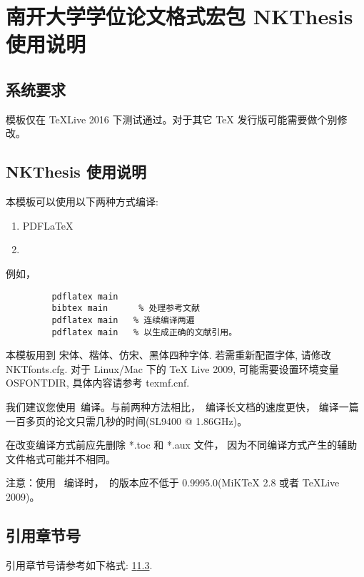 
\chapter{南开大学学位论文格式宏包 NKThesis 使用说明} \label{chpt:A}

\section{系统要求}

模板仅在 TeXLive 2016 下测试通过。对于其它 TeX 发行版可能需要做个别修改。

\section{NKThesis 使用说明}

本模板可以使用以下两种方式编译:
\begin{enumerate}
 \item PDF\LaTeX

 \item \XeLaTeX [推荐]
\end{enumerate}

例如，
\begin{verbatim}
         pdflatex main
         bibtex main      % 处理参考文献
         pdflatex main   % 连续编译两遍
         pdflatex main   % 以生成正确的文献引用。
\end{verbatim}





本模板用到 宋体、楷体、仿宋、黑体四种字体. 若需重新配置字体, 请修改 NKTfonts.cfg.
对于 Linux/Mac 下的 TeX Live 2009, 可能需要设置环境变量 OSFONTDIR, 具体内容请参考 texmf.cnf.


我们建议您使用\XeLaTeX\ 编译。与前两种方法相比，\XeLaTeX\  编译长文档的速度更快，
编译一篇一百多页的论文只需几秒的时间(SL9400 @ 1.86GHz)。

在改变编译方式前应先删除 *.toc 和 *.aux 文件，
因为不同编译方式产生的辅助文件格式可能并不相同。



注意：使用 \XeLaTeX\ 编译时，\XeTeX\ 的版本应不低于 0.9995.0(MiKTeX 2.8 或者 TeXLive 2009)。


\section{引用章节号}
\label{sec:ex:A}

引用章节号请参考如下格式: \ref{chpt:A}\ref{sec:ex:A}.


